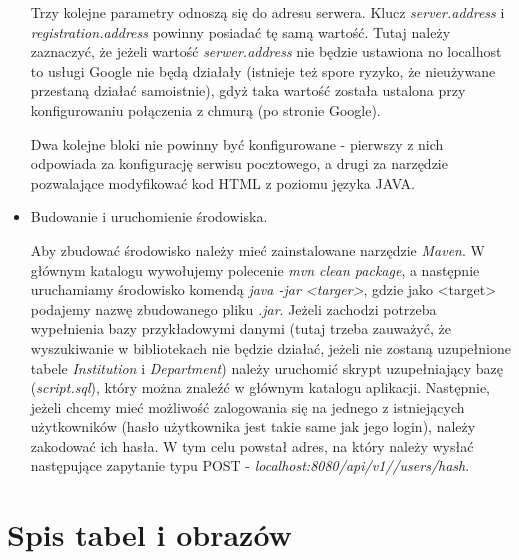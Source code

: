 \documentclass{report}
\begin{document}
\begin{itemize}
		Trzy kolejne parametry odnoszą się do adresu serwera. Klucz \textit{server.address} i \textit{registration.address} powinny posiadać tę samą wartość. Tutaj należy zaznaczyć, że jeżeli wartość \textit{serwer.address} nie będzie ustawiona no localhost to usługi Google nie będą działały (istnieje też spore ryzyko, że nieużywane przestaną działać samoistnie), gdyż taka wartość została ustalona przy konfigurowaniu połączenia z chmurą (po stronie Google).
		
		Dwa kolejne bloki nie powinny być konfigurowane - pierwszy z nich odpowiada za konfigurację serwisu pocztowego, a drugi za narzędzie pozwalające modyfikować kod HTML z poziomu języka JAVA.
		
	\item Budowanie i uruchomienie środowiska.
	
	Aby zbudować środowisko należy mieć zainstalowane narzędzie \textit{Maven}. W głównym katalogu wywołujemy polecenie \textit{mvn clean package}, a następnie uruchamiamy środowisko komendą \textit{java -jar <targer>}, gdzie jako <target> podajemy nazwę zbudowanego pliku \textit{.jar}. Jeżeli zachodzi potrzeba wypełnienia bazy przykładowymi danymi (tutaj trzeba zauważyć, że wyszukiwanie w bibliotekach nie będzie działać, jeżeli nie zostaną uzupełnione tabele \textit{Institution} i \textit{Department}) należy uruchomić skrypt uzupełniający bazę (\textit{script.sql}), który można znaleźć w głównym katalogu aplikacji. Następnie, jeżeli chcemy mieć możliwość zalogowania się na jednego z istniejących użytkowników (hasło użytkownika jest takie same jak jego login), należy zakodować ich hasła. W tym celu powstał adres, na który należy wysłać następujące zapytanie typu POST - \textit{localhost:8080/api/v1//users/hash}.
		
		
		

	
	
	
	

\end{itemize}

\chapter{Spis tabel i obrazów}


\begingroup
\let\clearpage\relax
\listoffigures
\listoftables
\endgroup
\end{document}
